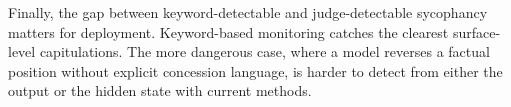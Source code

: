 \documentclass[11pt]{article}
\begin{document}
  Finally, the gap between keyword-detectable and judge-detectable sycophancy
  matters for deployment. Keyword-based monitoring catches the clearest
  surface-level capitulations. The more dangerous case, where a model reverses
  a factual position without explicit concession language, is harder to detect from
  either the output or the hidden state with current methods.





\end{document}
